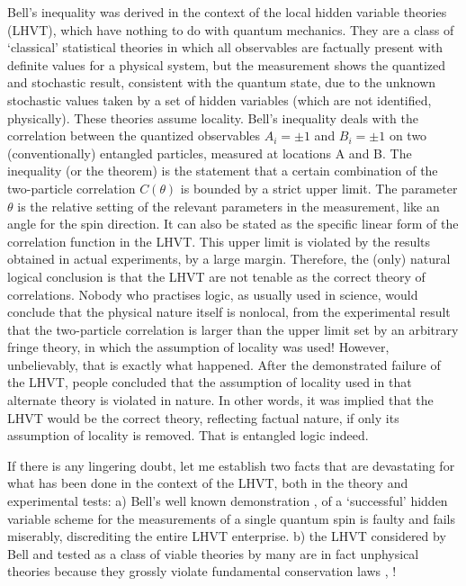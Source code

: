 Bell's inequality \cite{chap14-key12} was derived in the context of the local hidden variable theories
(LHVT), which have nothing to do with quantum mechanics. They are a class of `classical'
statistical theories in which all observables are factually present with definite values for a
physical system, but the measurement shows the quantized and stochastic result, consistent
with the quantum state, due to the unknown stochastic values taken by a set of hidden variables (which are not identified, physically). These theories assume locality. Bell's inequality deals with the correlation between the quantized observables $A_i = \pm 1$ and $B_i = \pm 1$ on two (conventionally)
entangled particles, measured at locations A and B. The inequality (or the theorem) is the
statement that a certain combination of the two-particle correlation $C (\theta)$ is bounded by a
strict upper limit. The parameter $\theta$ is the relative setting of the relevant parameters in the
measurement, like an angle for the spin direction. It can also be stated as the specific linear
form of the correlation function in the LHVT. This upper limit is violated by the results
obtained in actual experiments, by a large margin. Therefore, the (only) natural logical
conclusion is that the LHVT are not tenable as the correct theory of correlations. Nobody who practises
logic, as usually used in science, would conclude that the physical nature itself is nonlocal, from
the experimental result that the two-particle correlation is larger than the upper limit set
by an arbitrary fringe theory, in which the assumption of locality was used! However, 
unbelievably, that is exactly what happened. After the demonstrated failure of the LHVT,
people concluded that the assumption of locality used in that alternate theory is violated in nature. In
other words, it was implied that the LHVT would be the correct theory, reflecting factual nature, if only its
assumption of locality is removed. That is entangled logic indeed.

If there is any lingering doubt, let me establish two facts that are devastating for what
has been done in the context of the LHVT, both in the theory and experimental tests: a)
Bell's well known demonstration \cite{chap14-key12}, \cite{chap14-key13} of a `successful' hidden variable scheme for the
measurements of a single quantum spin is faulty and fails miserably, discrediting the entire
LHVT enterprise. b) the LHVT considered by Bell and tested as a class of viable theories by many
are in fact unphysical theories because they grossly violate fundamental conservation laws
\cite{chap14-key14}, \cite{chap14-key15}!
\bigskip

